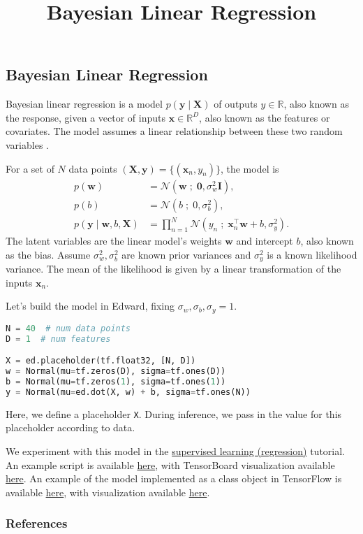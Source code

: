 \title{Bayesian Linear Regression}

\subsection{Bayesian Linear Regression}

Bayesian linear regression is a model $p(\mathbf{y}\mid \mathbf{X})$ of
outputs $y\in\mathbb{R}$, also known as the response, given
a vector of inputs
$\mathbf{x}\in\mathbb{R}^D$, also known as the features or covariates.
The model assumes a
linear relationship between these two random variables
\citep{murphy2012machine}.

For a set of $N$ data points $(\mathbf{X},\mathbf{y})=\{(\mathbf{x}_n, y_n)\}$,
the model is
\begin{align*}
  p(\mathbf{w})
  &=
  \mathcal{N}(\mathbf{w} \;;\; \mathbf{0}, \sigma_w^2\mathbf{I}),
  \\[1.5ex]
  p(b)
  &=
  \mathcal{N}(b \;;\; 0, \sigma_b^2),
  \\
  p(\mathbf{y} \mid \mathbf{w}, b, \mathbf{X})
  &=
  \prod_{n=1}^N
  \mathcal{N}(y_n \;;\; \mathbf{x}_n^\top\mathbf{w} + b, \sigma_y^2).
\end{align*}
The latent variables are the linear model's weights $\mathbf{w}$ and
intercept $b$, also known as the bias.
Assume $\sigma_w^2,\sigma_b^2$ are known prior variances and $\sigma_y^2$ is a
known likelihood variance. The mean of the likelihood is given by a
linear transformation of the inputs $\mathbf{x}_n$.

Let's build the model in Edward, fixing $\sigma_w,\sigma_b,\sigma_y=1$.
\begin{lstlisting}[language=Python]
N = 40  # num data points
D = 1  # num features

X = ed.placeholder(tf.float32, [N, D])
w = Normal(mu=tf.zeros(D), sigma=tf.ones(D))
b = Normal(mu=tf.zeros(1), sigma=tf.ones(1))
y = Normal(mu=ed.dot(X, w) + b, sigma=tf.ones(N))
\end{lstlisting}
Here, we define a placeholder \texttt{X}. During inference, we pass in
the value for this placeholder according to data.

We experiment with this model in the \href{/tutorials/supervised-regression}{supervised
learning (regression)} tutorial.
An example script is available
\href{https://github.com/blei-lab/edward/blob/master/examples/bayesian_linear_regression.py}
{here}, with TensorBoard visualization available
\href{https://github.com/blei-lab/edward/blob/master/examples/bayesian_linear_regression_tensorboard.py}
{here}.
An example of the model implemented as a class object in TensorFlow is
available
\href{https://github.com/blei-lab/edward/blob/master/examples/tf_bayesian_linear_regression.py}
{here}, with visualization available
\href{https://github.com/blei-lab/edward/blob/master/examples/tf_bayesian_linear_regression_plot.py}
{here}.

\subsubsection{References}\label{references}
